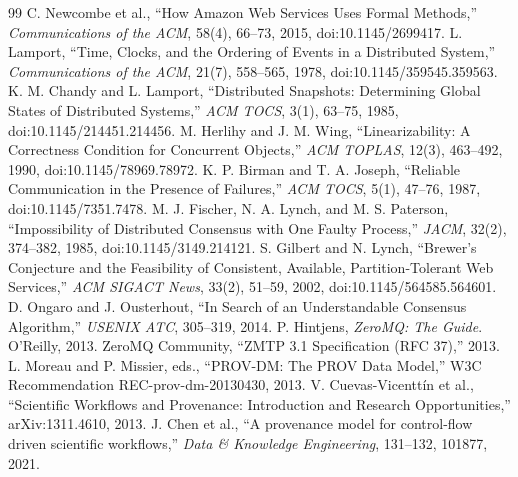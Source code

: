 \documentclass[11pt,a4paper]{article}
\begin{document}
\begin{thebibliography}{99}
 C. Newcombe et al., ``How Amazon Web Services Uses Formal Methods,''
\emph{Communications of the ACM}, 58(4), 66--73, 2015, doi:10.1145/2699417.
 L. Lamport, ``Time, Clocks, and the Ordering of Events in a Distributed
System,'' \emph{Communications of the ACM}, 21(7), 558--565, 1978, doi:10.1145/359545.359563.
 K. M. Chandy and L. Lamport, ``Distributed Snapshots: Determining
Global States of Distributed Systems,'' \emph{ACM TOCS}, 3(1), 63--75, 1985,
doi:10.1145/214451.214456.
 M. Herlihy and J. M. Wing, ``Linearizability: A Correctness
Condition for Concurrent Objects,'' \emph{ACM TOPLAS}, 12(3), 463--492, 1990,
doi:10.1145/78969.78972.
 K. P. Birman and T. A. Joseph, ``Reliable Communication in the
Presence of Failures,'' \emph{ACM TOCS}, 5(1), 47--76, 1987, doi:10.1145/7351.7478.
 M. J. Fischer, N. A. Lynch, and M. S. Paterson, ``Impossibility
of Distributed Consensus with One Faulty Process,'' \emph{JACM}, 32(2), 374--382, 1985,
doi:10.1145/3149.214121.
 S. Gilbert and N. Lynch, ``Brewer's Conjecture and the Feasibility of
Consistent, Available, Partition-Tolerant Web Services,'' \emph{ACM SIGACT News}, 33(2), 51--59,
2002, doi:10.1145/564585.564601.
 D. Ongaro and J. Ousterhout, ``In Search of an Understandable Consensus
Algorithm,'' \emph{USENIX ATC}, 305--319, 2014.
 P. Hintjens, \emph{ZeroMQ: The Guide}. O'Reilly, 2013.
 ZeroMQ Community, ``ZMTP 3.1 Specification (RFC 37),'' 2013.
 L. Moreau and P. Missier, eds., ``PROV-DM: The PROV Data Model,'' W3C
Recommendation REC-prov-dm-20130430, 2013.
 V. Cuevas-Vicenttín et al., ``Scientific Workflows and Provenance:
Introduction and Research Opportunities,'' arXiv:1311.4610, 2013.
 J. Chen et al., ``A provenance model for control-flow driven scientific
workflows,'' \emph{Data \& Knowledge Engineering}, 131--132, 101877, 2021.
\end{thebibliography}
\end{document}
